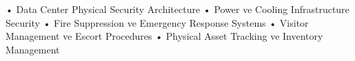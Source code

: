 • Data Center Physical Security Architecture
• Power ve Cooling Infrastructure Security
• Fire Suppression ve Emergency Response Systems
• Visitor Management ve Escort Procedures
• Physical Asset Tracking ve Inventory Management